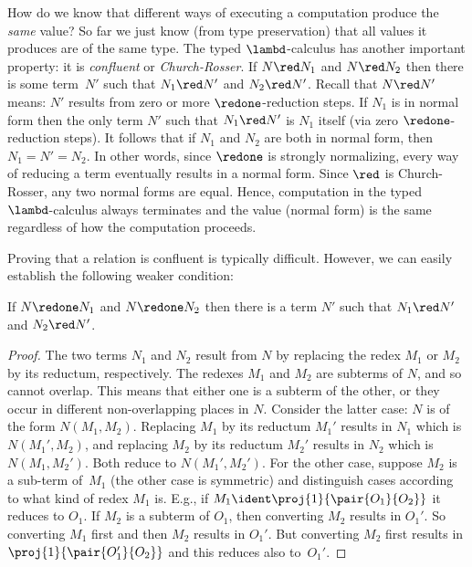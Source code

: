 \documentclass[../../../include/open-logic-section]{subfiles}
\begin{document}
How do we know that different ways of executing a computation produce
the \emph{same} value? So far we just know (from type preservation)
that all values it produces are of the same type. The typed
$\lambd$-calculus has another important property: it is
\emph{confluent} or \emph{Church-Rosser}. If $N \red N_1$ and $N \red
N_2$ then there is some term~$N'$ such that $N_1 \red N'$ and $N_2 \red
N'$. Recall that $N \red N'$ means: $N'$ results from zero or more
$\redone$-reduction steps. If $N_1$ is in normal form then the only
term $N'$ such that $N_1 \red N'$ is $N_1$ itself (via zero
$\redone$-reduction steps). It follows that if $N_1$ and $N_2$ are
both in normal form, then $N_1 = N' = N_2$. In other words, since
$\redone$ is strongly normalizing, every way of reducing a term
eventually results in a normal form. Since $\red$ is Church-Rosser,
any two normal forms are equal. Hence, computation in the typed
$\lambd$-calculus always terminates and the value (normal form) is the
same regardless of how the computation proceeds.

Proving that a relation is confluent is typically difficult. However,
we can easily establish the following weaker condition:

\begin{prop}
If $N \redone N_1$ and $N \redone N_2$ then there is a term $N'$ such
that $N_1 \red N'$ and $N_2 \red N'$.
\end{prop}

\begin{proof}
  The two terms $N_1$ and $N_2$ result from $N$ by replacing the redex
  $M_1$ or $M_2$ by its reductum, respectively. The redexes $M_1$ and
  $M_2$ are subterms of $N$, and so cannot overlap. This means that
  either one is a subterm of the other, or they occur in different
  non-overlapping places in $N$. Consider the latter case: $N$ is of
  the form $N(M_1,M_2)$. Replacing $M_1$ by its reductum $M_1'$
  results in $N_1$ which is $N(M_1',M_2)$, and replacing $M_2$ by its
  reductum $M_2'$ results in $N_2$ which is $N(M_1,M_2')$. Both reduce
  to $N(M_1',M_2')$. For the other case, suppose $M_2$ is a sub-term
  of~$M_1$ (the other case is symmetric) and distinguish cases
  according to what kind of redex $M_1$ is. E.g., if $M_1 \ident
  \proj{1}{\pair{O_1}{O_2}}$ it reduces to $O_1$. If $M_2$ is a
  subterm of $O_1$, then converting $M_2$ results in $O_1'$. So
  converting $M_1$ first and then $M_2$ results in $O_1'$. But
  converting $M_2$ first results in $\proj{1}{\pair{O_1'}{O_2}}$ and
  this reduces also to~$O_1'$.
\end{proof}
\end{document}
